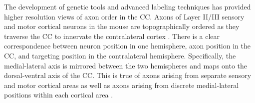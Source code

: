 The development of genetic tools and advanced labeling techniques has provided higher resolution views of axon order in the CC. 
Axons of Layer II/III sensory and motor cortical neurons in the mouse are topographically ordered as they traverse the CC to innervate the contralateral cortex \cite{zhou2013axon}. 
There is a clear correspondence between neuron position in one hemisphere, axon position in the CC, and targeting position in the contralateral hemisphere.
Specifically, the medial-lateral axis is mirrored between the two hemispheres and maps onto the dorsal-ventral axis of the CC. 
This is true of axons arising from separate sensory and motor cortical areas as well as axons arising from discrete medial-lateral positions within each cortical area \cite{zhou2013axon}. 